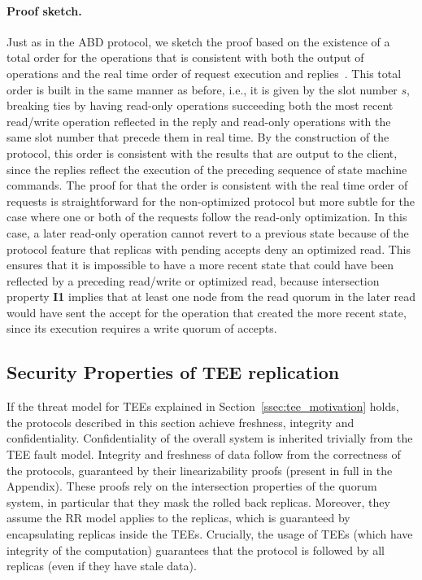 \paragraph{Proof sketch.}
Just as in the \ac{ABD} protocol, we sketch the proof based on
the existence of a total order for the operations that is
consistent with both the output of operations and the real time
order of request execution and replies~\cite{nancy-book}. This
total order is built in the same manner as before, i.e., it is
given by the slot number $s$, breaking ties by having read-only
operations succeeding both the most recent read/write operation
reflected in the reply and read-only operations with the
same slot number that precede them in real time. By the
construction of the protocol, this order is consistent with the
results that are output to the client, since the replies reflect
the execution of the preceding sequence of state machine commands.
The proof for that the order is consistent with
the real time order of requests is straightforward for the
non-optimized protocol but more subtle for the case where one or
both of the requests follow the read-only optimization.
In this case, a later read-only operation cannot revert to a
previous state because of the protocol feature that replicas with
pending accepts deny an optimized read.  This ensures that
it is impossible to have a more recent state
that could have been reflected by a preceding read/write or
optimized read, because intersection property \textbf{I1} implies
that at least one node from the read quorum in the later read
would have sent the accept for the operation that created the
more recent state, since its execution requires a write quorum of
accepts.


\subsection{Security Properties of \ac{TEE}
replication}\label{ssec:model_sec_prop}
If the threat model for \acp{TEE} explained in
Section~\ref{ssec:tee_motivation} holds, the protocols described in this
section achieve freshness, integrity and confidentiality.
Confidentiality of the overall system is inherited trivially from the
\ac{TEE} fault model. Integrity and freshness of data follow from the
correctness of the protocols, guaranteed by their linearizability
proofs (present in full in the Appendix). These proofs rely on
the intersection properties of the quorum system, in particular
that they mask the rolled back replicas. Moreover, they assume the
\ac{RR} model applies to the replicas, which is
guaranteed by encapsulating replicas inside the \acp{TEE}. Crucially,
the usage of \acp{TEE} (which have integrity of the computation)
guarantees that the protocol is followed by all replicas (even if
they have stale data).

